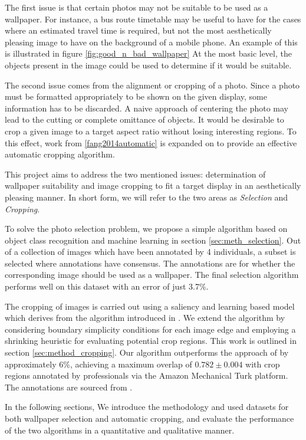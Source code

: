 The first issue is that certain photos may not be suitable to be used as a wallpaper.
For instance, a bus route timetable may be useful to have for the cases where an estimated travel time is required, but not the most aesthetically pleasing image to have on the background of a mobile phone.
An example of this is illustrated in figure \ref{fig:good_n_bad_wallpaper}
At the most basic level, the objects present in the image could be used to determine if it would be suitable.

The second issue comes from the alignment or cropping of a photo.
Since a photo must be formatted appropriately to be shown on the given display, some information has to be discarded.
A naive approach of centering the photo may lead to the cutting or complete omittance of objects.
It would be desirable to crop a given image to a target aspect ratio without losing interesting regions.
To this effect, work from \ref{fang2014automatic} is expanded on to provide an effective automatic cropping algorithm.

This project aims to address the two mentioned issues: determination of wallpaper suitability and image cropping to fit a target display in an aesthetically pleasing manner.
In short form, we will refer to the two areas as \emph{Selection} and \emph{Cropping}.

To solve the photo selection problem, we propose a simple algorithm based on object class recognition and machine learning in section \ref{sec:meth_selection}.
Out of a collection of images which have been annotated by 4 individuals, a subset is selected where annotations have consensus.
The annotations are for whether the corresponding image should be used as a wallpaper.
The final selection algorithm performs well on this dataset with an error of just 3.7\%.

The cropping of images is carried out using a saliency and learning based model which derives from the algorithm introduced in \cite{fang2014automatic}.
We extend the algorithm by considering boundary simplicity conditions for each image edge and employing a shrinking heuristic for evaluating potential crop regions.
This work is outlined in section \ref{sec:method_cropping}.
Our algorithm outperforms the approach of \cite{fang2014automatic} by approximately 6\%, achieving a maximum overlap of $0.782 \pm 0.004$ with crop regions annotated by professionals via the Amazon Mechanical Turk platform.
The annotations are sourced from \cite{fang2014automatic}.

In the following sections, We introduce the methodology and used datasets for both wallpaper selection and automatic cropping, and evaluate the performance of the two algorithms in a quantitative and qualitative manner.

